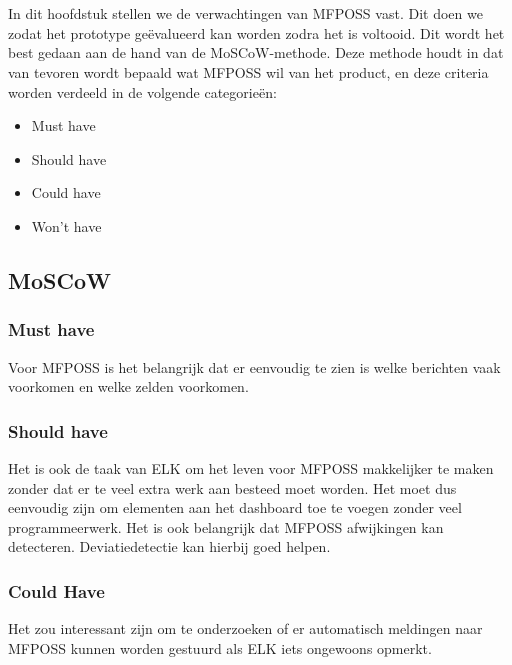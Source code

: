 
\chapter{}%
\label{ch:methodologie}

In dit hoofdstuk stellen we de verwachtingen van MFPOSS vast. Dit doen we zodat het prototype geëvalueerd kan worden zodra het is voltooid. Dit wordt het best gedaan aan de hand van de MoSCoW-methode. Deze methode houdt in dat van tevoren wordt bepaald wat MFPOSS wil van het product, en deze criteria worden verdeeld in de volgende categorieën:

\begin{itemize}
    \item Must have
    \item Should have
    \item Could have
    \item Won't have
\end{itemize}

\section{MoSCoW}

\subsection{Must have}
Voor MFPOSS is het belangrijk dat er eenvoudig te zien is welke berichten vaak voorkomen en welke zelden voorkomen.

\subsection{Should have}
Het is ook de taak van ELK om het leven voor MFPOSS makkelijker te maken zonder dat er te veel extra werk aan besteed moet worden. Het moet dus eenvoudig zijn om elementen aan het dashboard toe te voegen zonder veel programmeerwerk. Het is ook belangrijk dat MFPOSS afwijkingen kan detecteren. Deviatiedetectie kan hierbij goed helpen.

\subsection{Could Have}
Het zou interessant zijn om te onderzoeken of er automatisch meldingen naar MFPOSS kunnen worden gestuurd als ELK iets ongewoons opmerkt.

